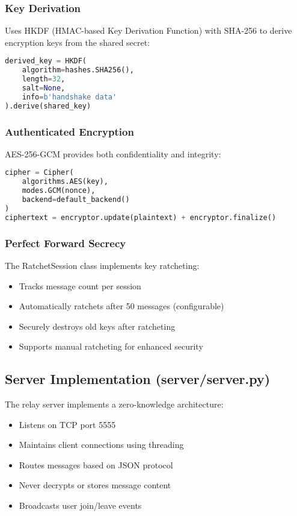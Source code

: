 \documentclass[12pt,a4paper]{article}
\begin{document}
\subsubsection{Key Derivation}
Uses HKDF (HMAC-based Key Derivation Function) with SHA-256 to derive encryption keys from the shared secret:

\begin{lstlisting}[language=Python]
derived_key = HKDF(
    algorithm=hashes.SHA256(),
    length=32,
    salt=None,
    info=b'handshake data'
).derive(shared_key)
\end{lstlisting}

\subsubsection{Authenticated Encryption}
AES-256-GCM provides both confidentiality and integrity:

\begin{lstlisting}[language=Python]
cipher = Cipher(
    algorithms.AES(key),
    modes.GCM(nonce),
    backend=default_backend()
)
ciphertext = encryptor.update(plaintext) + encryptor.finalize()
\end{lstlisting}

\subsubsection{Perfect Forward Secrecy}
The RatchetSession class implements key ratcheting:

\begin{itemize}
    \item Tracks message count per session
    \item Automatically ratchets after 50 messages (configurable)
    \item Securely destroys old keys after ratcheting
    \item Supports manual ratcheting for enhanced security
\end{itemize}

\subsection{Server Implementation (server/server.py)}

The relay server implements a zero-knowledge architecture:

\begin{itemize}
    \item Listens on TCP port 5555
    \item Maintains client connections using threading
    \item Routes messages based on JSON protocol
    \item Never decrypts or stores message content
    \item Broadcasts user join/leave events
\end{itemize}
\end{document}
